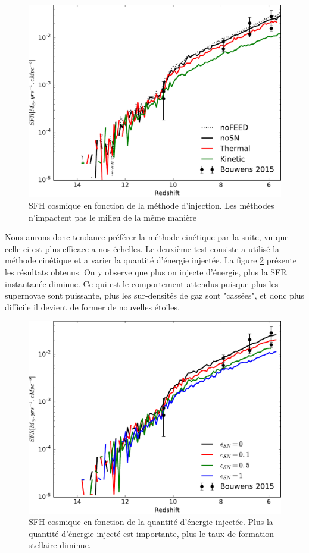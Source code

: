 
\begin{figure}[bth]
        \includegraphics[width=.95\textwidth]{img/03/sedov/SFRmethode.pdf} 
        \caption{SFH cosmique en fonction de la méthode d'injection.
        Les méthodes n'impactent pas le milieu de la même manière
        }
 		\label{fig:sfr_methode}
\end{figure}

Nous aurons donc tendance préférer la méthode cinétique par la suite, vu que celle ci est plus efficace a nos échelles.
Le deuxième test consiste a utilisé la méthode cinétique et a varier la quantité d'énergie injectée.
La figure \ref{fig:sfr_egy} présente les résultats obtenus.
On y observe que plus on injecte d'énergie, plus la SFR instantanée diminue.
Ce qui est le comportement attendus puisque plus les supernovae sont puissante, plus les sur-densités de gaz sont "cassées", et donc plus difficile il devient de former de nouvelles étoiles.

\begin{figure}[bth]
        \includegraphics[width=.95\textwidth]{img/03/sedov/sneff_SFR.pdf} 
        \caption{SFH cosmique en fonction de la quantité d'énergie injectée. 
        Plus la quantité d'énergie injecté est importante, plus le taux de formation stellaire diminue.
        }
 		\label{fig:sfr_egy}
\end{figure}



